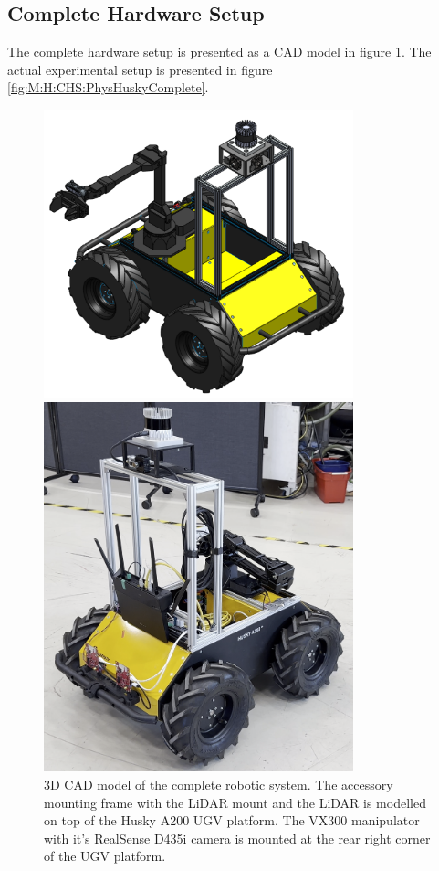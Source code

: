 \subsection{Complete Hardware Setup}
The complete hardware setup is presented as a CAD model in figure \ref{fig:M:H:CHS:CadHuskyComplete}. The actual experimental setup is presented in figure \ref{fig:M:H:CHS:PhysHuskyComplete}. 


\begin{figure}[H]
  \centering
  \begin{minipage}[b]{0.49\textwidth}
    \centering
    \includegraphics[width = 0.8\textwidth]{Figures/husky_completed.pdf}
    \caption{3D CAD model of the complete robotic system. The accessory mounting frame with the LiDAR mount and the LiDAR is modelled on top of the Husky A200 UGV platform. The VX300 manipulator with it's RealSense D435i camera is mounted at the rear right corner of the UGV platform.}
    \label{fig:M:H:CHS:CadHuskyComplete}
  \end{minipage}
  \hfill
  \begin{minipage}[b]{0.49\textwidth}
    \centering
    \includegraphics[width = 0.8\textwidth]{Figures/figHuskyComplete.png}

\end{minipage}
\end{figure}

